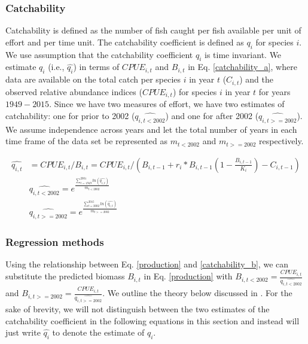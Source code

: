 \documentclass[oneside,12pt,final]{sty/ucthesis-CA2012}
\begin{document}
\begin{mainmatter}
\subsubsection{Catchability}
Catchability is defined as the number of fish caught per fish available per unit of effort and per time unit. The catchability coefficient is defined as $q_{i}$ for species $i$.  We use \citet{hilborn1992quantitative} assumption that the catchability coefficient $q_{i}$ is time invariant. We estimate $q_{i}$ (i.e., $\widehat{q_{i}} $) in terms of $CPUE_{i,t}$ and $B_{i,t}$ in Eq. \ref{catchability_a}, where data are available on the total catch per species $i$ in year $t$ ($C_{i,t}$) and the observed relative abundance indices ($CPUE_{i,t}$) for species $i$ in year $t$ for years $1949-2015$. Since we have two measures of effort, we have two estimates of catchability: one for prior to 2002 ($\widehat{q_{i,t<2002}}$) and one for after 2002 ($\widehat{q_{i,t>=2002}}$). We assume independence across years and let the total number of years in each time frame of the data set be represented as $m_{t<2002}$ and $m_{t>=2002}$ respectively. 

\begin{align} \label{catchability_a}
\widehat{q_{i,t}} &= CPUE_{i,t}/B_{i,t}  = CPUE_{i,t}/\left(B_{i,t-1} + r_i*B_{i,t-1} \left( 1- \frac{B_{i,t-1}}{K_i} \right)-C_{i,t-1} \right) \\ \label{catchability_b}
&\widehat{q_{i,t<2002}} = e^{\frac{\sum_{t=1949}^{2001} ln(\widehat{q_{i,t}}) }{m_{t<2002} }}  \\
&\widehat{q_{i,t>=2002}} = e^{\frac{\sum_{t=2002}^{2015} ln(\widehat{q_{i,t}} ) }{m_{t>=2002}}}  
\end{align}

\subsubsection{Regression methods}
Using the relationship between Eq. \ref{production} and \ref{catchability_b}, we can substitute the predicted biomass $B_{i,t}$ in Eq. \ref{production} with $B_{i,t<2002}=\frac{CPUE_{i,t}}{\widehat{q_{i,t<2002}}} $ and $B_{i,t>=2002}=\frac{CPUE_{i,t}}{\widehat{q_{i,t>=2002}}} $. We outline the theory below discussed in \citet{hilborn1992quantitative}. For the sake of brevity, we will not distinguish between the two estimates of the catchability coefficient in the following equations in this section and instead will just write $\widehat{q_i}$ to denote the estimate of $q_i$. 


\end{mainmatter}
\end{document}
